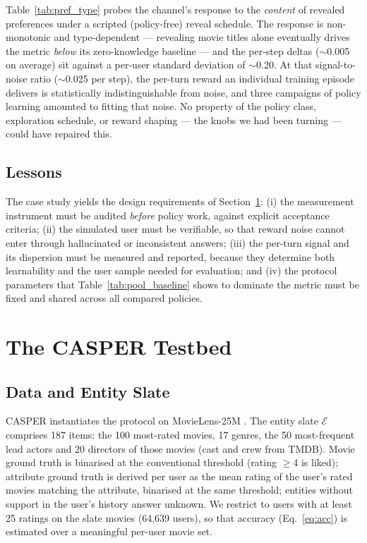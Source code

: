 \documentclass[11pt]{article}
\begin{document}
Table~\ref{tab:pref_type} probes the channel's response to the
\emph{content} of revealed preferences under a scripted (policy-free)
reveal schedule. The response is non-monotonic and type-dependent ---
revealing movie titles alone eventually drives the metric \emph{below} its
zero-knowledge baseline --- and the per-step deltas ($\sim$0.005 on
average) sit against a per-user standard deviation of $\sim$0.20. At that
signal-to-noise ratio ($\sim$0.025 per step), the per-turn reward an
individual training episode delivers is statistically indistinguishable
from noise, and three campaigns of policy learning amounted to fitting
that noise. No property of the policy class, exploration schedule, or
reward shaping --- the knobs we had been turning --- could have repaired
this.

\subsection{Lessons}

The case study yields the design requirements of
Section~\ref{sec:testbed}: (i) the measurement instrument must be audited
\emph{before} policy work, against explicit acceptance criteria; (ii) the
simulated user must be verifiable, so that reward noise cannot enter
through hallucinated or inconsistent answers; (iii) the per-turn signal
and its dispersion must be measured and reported, because they determine
both learnability and the user sample needed for evaluation; and (iv) the
protocol parameters that Table~\ref{tab:pool_baseline} shows to dominate
the metric must be fixed and shared across all compared policies.

\section{The CASPER Testbed}
\label{sec:testbed}

\subsection{Data and Entity Slate}

CASPER instantiates the protocol on MovieLens-25M \citep{harper2015movielens}.
The entity slate $\mathcal{E}$ comprises 187 items: the 100 most-rated
movies, 17 genres, the 50 most-frequent lead actors and 20 directors of
those movies (cast and crew from TMDB). Movie ground truth is binarised at
the conventional threshold (rating $\geq 4$ is \textsf{liked}); attribute
ground truth is derived per user as the mean rating of the user's rated
movies matching the attribute, binarised at the same threshold; entities
without support in the user's history answer \textsf{unknown}. We restrict
to users with at least 25 ratings on the slate movies (64{,}639 users), so
that accuracy (Eq.~\ref{eq:acc}) is estimated over a meaningful per-user
movie set.
\end{document}
